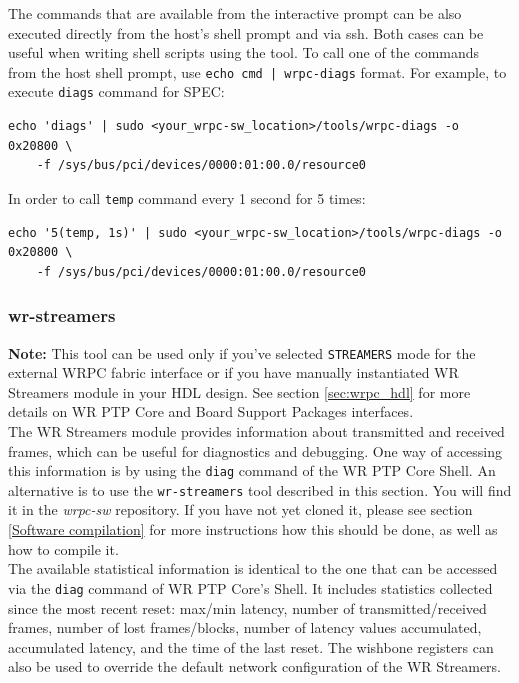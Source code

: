 \documentclass[a4paper, 12pt]{article}
\renewcommand{\_}{\underscore\allowbreak}
\newcommand{\tts}[1]{
  \texttt{\small{#1}}}
\begin{document}
The commands that are available from the interactive prompt can be also executed directly
from the host's shell prompt and via ssh. Both cases can be useful when writing shell
scripts using the tool. To call one of the commands from the host shell prompt,
use \texttt{echo cmd | wrpc-diags} format. For example, to execute
\texttt{diags} command for SPEC:
\begin{lstlisting}
echo 'diags' | sudo <your_wrpc-sw_location>/tools/wrpc-diags -o 0x20800 \
    -f /sys/bus/pci/devices/0000:01:00.0/resource0
\end{lstlisting}
In order to  call \texttt{temp} command every 1 second for 5 times:
\begin{lstlisting}
echo '5(temp, 1s)' | sudo <your_wrpc-sw_location>/tools/wrpc-diags -o 0x20800 \
    -f /sys/bus/pci/devices/0000:01:00.0/resource0
\end{lstlisting}


\subsubsection{wr-streamers}
\label{sec:wr-streamers-tool}

{\bf Note:} This tool can be used only if you've selected \tts{STREAMERS} mode
for the external WRPC fabric interface or if you have manually instantiated
WR Streamers module in your HDL design. See section \ref{sec:wrpc_hdl} for more
details on WR PTP Core and Board Support Packages interfaces.\\

The WR Streamers module provides information about transmitted and received
frames, which can be useful for diagnostics and debugging. One way of accessing
this information is by using the \texttt{diag} command of the WR PTP Core Shell.
An alternative is to use the \texttt{wr-streamers} tool described in this
section. You will find it in the \textit{wrpc-sw} repository. If
you have not yet cloned it, please see section \ref{Software compilation}
for more instructions how this should be done, as well as how to compile it.\\

The available statistical information is identical to the one that can be
accessed via the \texttt{diag} command of WR PTP Core's Shell. It includes
statistics collected since the most recent reset: max/min latency, number of
transmitted/received frames, number of lost frames/blocks, number of latency
values accumulated, accumulated latency, and the time of the last reset. The
wishbone registers can also be used to override the default network
configuration of the WR Streamers.\\
\end{document}
